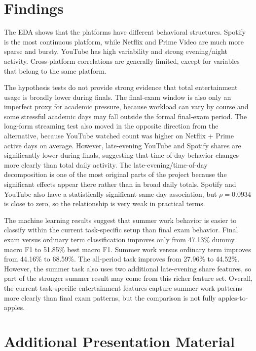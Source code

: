 \documentclass[11pt,a4paper]{article}
\begin{document}
\section{Findings}

The EDA shows that the platforms have different behavioral structures. Spotify is the most continuous platform, while Netflix and Prime Video are much more sparse and bursty. YouTube has high variability and strong evening/night activity. Cross-platform correlations are generally limited, except for variables that belong to the same platform.

The hypothesis tests do not provide strong evidence that total entertainment usage is broadly lower during finals. The final-exam window is also only an imperfect proxy for academic pressure, because workload can vary by course and some stressful academic days may fall outside the formal final-exam period. The long-form streaming test also moved in the opposite direction from the alternative, because YouTube watched count was higher on Netflix + Prime active days on average. However, late-evening YouTube and Spotify shares are significantly lower during finals, suggesting that time-of-day behavior changes more clearly than total daily activity. The late-evening/time-of-day decomposition is one of the most original parts of the project because the significant effects appear there rather than in broad daily totals. Spotify and YouTube also have a statistically significant same-day association, but $\rho=0.0934$ is close to zero, so the relationship is very weak in practical terms.

The machine learning results suggest that summer work behavior is easier to classify within the current task-specific setup than final exam behavior. Final exam versus ordinary term classification improves only from 47.13\% dummy macro F1 to 51.85\% best macro F1. Summer work versus ordinary term improves from 44.16\% to 68.59\%. The all-period task improves from 27.96\% to 44.52\%. However, the summer task also uses two additional late-evening share features, so part of the stronger summer result may come from this richer feature set. Overall, the current task-specific entertainment features capture summer work patterns more clearly than final exam patterns, but the comparison is not fully apples-to-apples.

\section{Additional Presentation Material}
\end{document}
